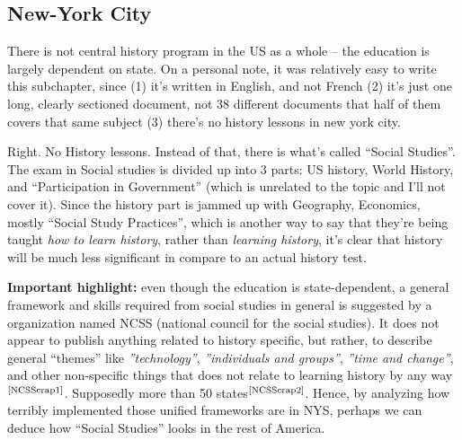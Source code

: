 \documentclass[12pt]{../../../tex/classes/styledArticle}
\newcommand\mc[1]  {$^{\text{\cite{#1}}}$}
\begin{document}
	\subsection{New-York City}
	There is not central history program in the US as a whole -- the education is largely dependent on state. On a personal note, it was relatively easy to write this subchapter, since (1) it's written in English, and not French (2) it's just one long, clearly sectioned document, not 38 different documents that half of them covers that same subject (3) there's no history lessons in new york city. 
	
	Right. No History lessons. Instead of that, there is what's called ``Social Studies''. The exam in Social studies is divided up into 3 parts: US history, World History, and ``Participation in Government'' (which is unrelated to the topic and I'll not cover it). Since the history part is jammed up with Geography, Economics, mostly ``Social Study Practices'', which is another way to say that they're being taught \textit{how to learn history}, rather than \textit{learning history}, it's clear that history will be much less significant in compare to an actual history test. 
	
	\textbf{Important highlight: }even though the education is state-dependent, a general framework and skills required from social studies in general is suggested by a organization named NCSS (national council for the social studies). It does not appear to publish anything related to history specific, but rather, to describe general ``themes'' like \textit{''technology''}, \textit{''individuals and groups''}, \textit{''time and change''}, and other non-specific things that does not relate to learning history by any way\mc{NCSScrap1}. Supposedly more than 50 states\mc{NCSScrap2}. Hence, by analyzing how terribly implemented those unified frameworks are in NYS, perhaps we can deduce how ``Social Studies'' looks in the rest of America. 
	
\end{document}
